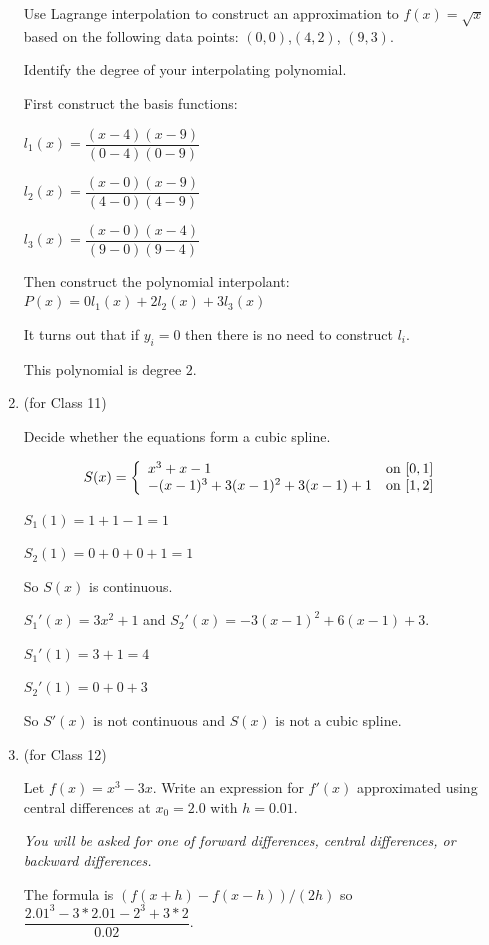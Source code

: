\documentclass[12pt,letterpaper,answers]{exam}
\begin{document}
\begin{enumerate}
Use Lagrange interpolation to construct an approximation to $f(x) = \sqrt{x}$ based on the following data points: $(0,0)$,$(4,2)$, $(9,3)$.

Identify the degree of your interpolating polynomial.

\begin{solution}
First construct the basis functions:

$l_1(x) = \dfrac{(x-4)(x-9)}{(0-4)(0-9)}$

$l_2(x) = \dfrac{(x-0)(x-9)}{(4-0)(4-9)}$

$l_3(x) = \dfrac{(x-0)(x-4)}{(9-0)(9-4)}$

Then construct the polynomial interpolant:
$P(x) = 0l_1(x) + 2l_2(x) + 3l_3(x)$

It turns out that if $y_i = 0$ then there is no need to construct $l_i$.

This polynomial is degree $2$.

\end{solution}

\item (for Class 11)

Decide whether the equations form a cubic spline.

\[S(x) = \left\{\begin{array}{l l}
x^3 + x - 1 & \text{on }[0,1] \\
-(x-1)^3 + 3(x-1)^2 + 3(x-1) + 1 & \text{on }[1,2] \\
\end{array}\right.\]

\begin{solution}

$S_1(1) = 1+1-1 = 1$

$S_2(1) = 0 + 0 + 0 + 1 = 1$

So $S(x)$ is continuous.

$S_1'(x) = 3x^2 + 1$ and $S_2'(x) = -3(x-1)^2 + 6(x-1) + 3$.

$S_1'(1) = 3 + 1 = 4$

$S_2'(1) = 0 + 0 + 3$

So $S'(x)$ is not continuous and $S(x)$ is not a cubic spline.
\end{solution}

\item (for Class 12)

Let $f(x) = x^3 - 3x$.  Write an expression for $f'(x)$ approximated using central differences at $x_0 = 2.0$ with $h = 0.01$.

\emph{You will be asked for one of forward differences, central differences, or backward differences.}
\begin{solution}
 The formula is $(f(x+h) - f(x-h))/(2h)$ so $\dfrac{2.01^3-3*2.01 - 2^3+3*2}{0.02}$.
\end{solution}


\end{enumerate}
\end{document}
